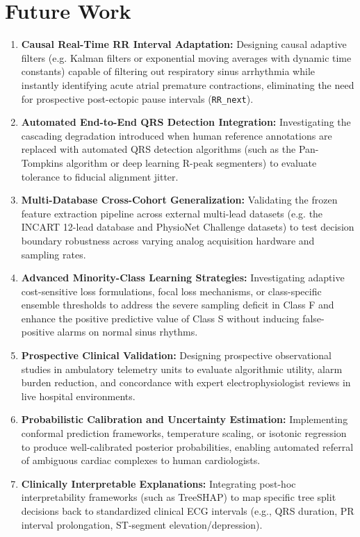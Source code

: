 \documentclass[conference]{IEEEtran}
\begin{document}
\section{Future Work}
\begin{enumerate}
    \item \textbf{Causal Real-Time RR Interval Adaptation:} Designing causal adaptive filters (e.g. Kalman filters or exponential moving averages with dynamic time constants) capable of filtering out respiratory sinus arrhythmia while instantly identifying acute atrial premature contractions, eliminating the need for prospective post-ectopic pause intervals (\texttt{RR\_next}).
    \item \textbf{Automated End-to-End QRS Detection Integration:} Investigating the cascading degradation introduced when human reference annotations are replaced with automated QRS detection algorithms (such as the Pan-Tompkins algorithm or deep learning R-peak segmenters) to evaluate tolerance to fiducial alignment jitter.
    \item \textbf{Multi-Database Cross-Cohort Generalization:} Validating the frozen feature extraction pipeline across external multi-lead datasets (e.g. the INCART 12-lead database and PhysioNet Challenge datasets) to test decision boundary robustness across varying analog acquisition hardware and sampling rates.
    \item \textbf{Advanced Minority-Class Learning Strategies:} Investigating adaptive cost-sensitive loss formulations, focal loss mechanisms, or class-specific ensemble thresholds to address the severe sampling deficit in Class F and enhance the positive predictive value of Class S without inducing false-positive alarms on normal sinus rhythms.
    \item \textbf{Prospective Clinical Validation:} Designing prospective observational studies in ambulatory telemetry units to evaluate algorithmic utility, alarm burden reduction, and concordance with expert electrophysiologist reviews in live hospital environments.
    \item \textbf{Probabilistic Calibration and Uncertainty Estimation:} Implementing conformal prediction frameworks, temperature scaling, or isotonic regression to produce well-calibrated posterior probabilities, enabling automated referral of ambiguous cardiac complexes to human cardiologists.
    \item \textbf{Clinically Interpretable Explanations:} Integrating post-hoc interpretability frameworks (such as TreeSHAP) to map specific tree split decisions back to standardized clinical ECG intervals (e.g., QRS duration, PR interval prolongation, ST-segment elevation/depression).
\end{enumerate}
\end{document}
